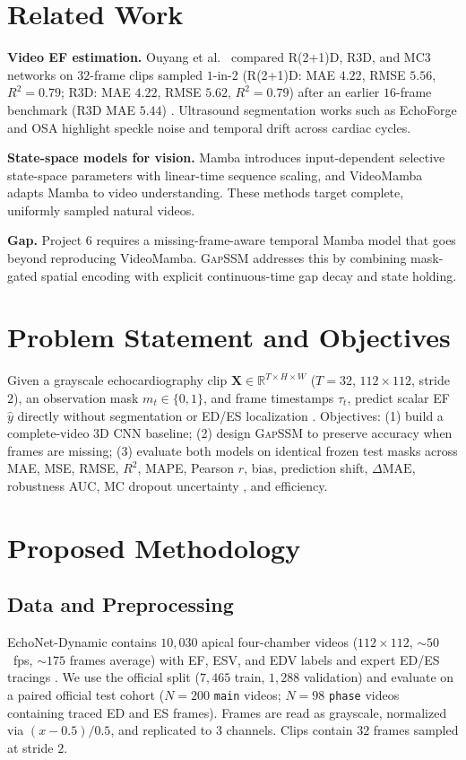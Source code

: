 \documentclass[conference]{IEEEtran}
\begin{document}
\section{Related Work}
\textbf{Video EF estimation.} Ouyang et al.\ \cite{ouyang2020video} compared R(2+1)D, R3D, and MC3 networks on $32$-frame clips sampled $1$-in-$2$ (R(2+1)D: MAE $4.22$, RMSE $5.56$, $R^2=0.79$; R3D: MAE $4.22$, RMSE $5.62$, $R^2=0.79$) after an earlier $16$-frame benchmark (R3D MAE $5.44$) \cite{ouyang2019echonet}. Ultrasound segmentation works such as EchoForge \cite{fang2025echoforge} and OSA \cite{wang2025osa} highlight speckle noise and temporal drift across cardiac cycles.

\textbf{State-space models for vision.} Mamba \cite{gu2023mamba} introduces input-dependent selective state-space parameters with linear-time sequence scaling, and VideoMamba \cite{li2024videomamba} adapts Mamba to video understanding. These methods target complete, uniformly sampled natural videos.

\textbf{Gap.} Project 6 \cite{project6spec} requires a missing-frame-aware temporal Mamba model that goes beyond reproducing VideoMamba. \textsc{GapSSM} addresses this by combining mask-gated spatial encoding with explicit continuous-time gap decay and state holding.

\section{Problem Statement and Objectives}
Given a grayscale echocardiography clip $\mathbf{X} \in \mathbb{R}^{T \times H \times W}$ ($T=32$, $112\times 112$, stride $2$), an observation mask $m_t \in \{0,1\}$, and frame timestamps $\tau_t$, predict scalar EF $\hat{y}$ directly without segmentation or ED/ES localization \cite{project6spec}. Objectives: (1) build a complete-video 3D CNN baseline; (2) design \textsc{GapSSM} to preserve accuracy when frames are missing; (3) evaluate both models on identical frozen test masks across MAE, MSE, RMSE, $R^2$, MAPE, Pearson $r$, bias, prediction shift, $\Delta\text{MAE}$, robustness AUC, MC dropout uncertainty \cite{gal2016dropout}, and efficiency.

\section{Proposed Methodology}

\subsection{Data and Preprocessing}
EchoNet-Dynamic contains $10,030$ apical four-chamber videos ($112\times 112$, $\sim 50$~fps, $\sim 175$ frames average) with EF, ESV, and EDV labels and expert ED/ES tracings \cite{ouyang2020video}. We use the official split ($7,465$ train, $1,288$ validation) and evaluate on a paired official test cohort ($N=200$ \texttt{main} videos; $N=98$ \texttt{phase} videos containing traced ED and ES frames). Frames are read as grayscale, normalized via $(x-0.5)/0.5$, and replicated to $3$ channels. Clips contain $32$ frames sampled at stride $2$.
\end{document}
